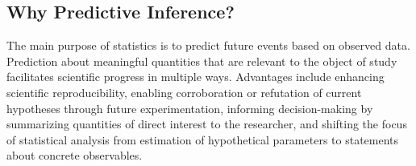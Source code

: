 \documentclass[12pt, a4paper]{article}
\begin{document}
  \subsection{Why Predictive Inference?}


%
    The main purpose of statistics is to predict future events based on observed data.  Prediction about meaningful quantities that are relevant to the object of study facilitates scientific progress in multiple ways.  Advantages include enhancing scientific reproducibility, enabling corroboration or refutation of current hypotheses through future experimentation, informing decision-making by summarizing quantities of direct interest to the researcher, and shifting the focus of statistical analysis from estimation of hypothetical parameters to statements about concrete observables.
\end{document}
